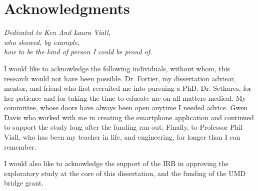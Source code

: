 \documentclass{umthesis}
\begin{document}
%
    


\chapter*{Acknowledgments}             %
	\begin{center}
	\emph{Dedicated to Ken And Laura Viall, \\ who showed, by example, \\ how to be the kind of person I could be proud of.}
	\end{center}
  
  \parskip
  \parskip
  
  I would like to acknowledge the following individuals, without whom, this research would not have been possible. Dr. Fortier, my dissertation advisor, mentor, and friend who first recruited me into pursuing a PhD. Dr. Sethares, for her patience and for taking the time to educate me on all matters medical. My committee, whose doors have always been open anytime I needed advice. Gwen Davis who worked with me in creating the smartphone application and continued to support the study long after the funding ran out. Finally, to Professor Phil Viall, who has been my teacher in life, and engineering, for longer than I can remember. 
  
  I would also like to acknowledge the support of the IRB in approving the exploratory study at the core of this dissertation, and the funding of the UMD bridge grant.
  


\cleardoublepage
{}




\clearpage
\tableofcontents				 %
\clearpage
{}
{}
\listoffigures                  %
\end{document}
